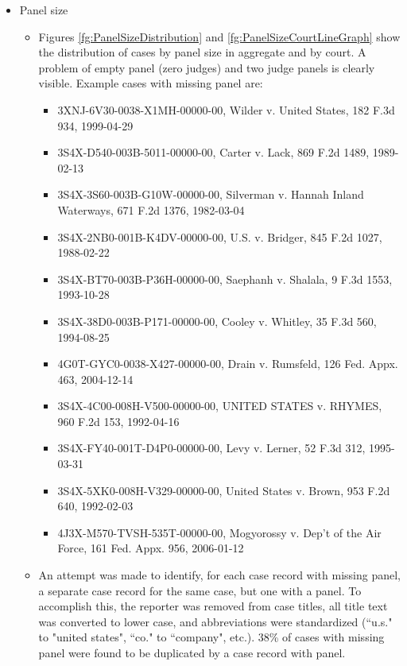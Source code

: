 \documentclass[10pt, letterpaper]{article}
\begin{document}
\begin{spacing}{1.0}
\begin{itemize}
    \item Panel size
    \begin{itemize}
        \item Figures \ref{fg:PanelSizeDistribution} and \ref{fg:PanelSizeCourtLineGraph} show the distribution of cases by panel size in aggregate and by court.  A problem of empty panel (zero judges) and two judge panels is clearly visible.  Example cases with missing panel are:
        \begin{itemize}
            \item 3XNJ-6V30-0038-X1MH-00000-00, Wilder v. United States, 182 F.3d 934, 1999-04-29
            \item 3S4X-D540-003B-5011-00000-00, Carter v. Lack, 869 F.2d 1489, 1989-02-13
            \item 3S4X-3S60-003B-G10W-00000-00, Silverman v. Hannah Inland Waterways, 671 F.2d 1376, 1982-03-04
            \item 3S4X-2NB0-001B-K4DV-00000-00, U.S. v. Bridger, 845 F.2d 1027, 1988-02-22
            \item 3S4X-BT70-003B-P36H-00000-00, Saephanh v. Shalala, 9 F.3d 1553, 1993-10-28
            \item 3S4X-38D0-003B-P171-00000-00, Cooley v. Whitley, 35 F.3d 560, 1994-08-25
            \item 4G0T-GYC0-0038-X427-00000-00, Drain v. Rumsfeld, 126 Fed. Appx. 463, 2004-12-14
            \item 3S4X-4C00-008H-V500-00000-00, UNITED STATES v. RHYMES, 960 F.2d 153, 1992-04-16
            \item 3S4X-FY40-001T-D4P0-00000-00, Levy v. Lerner, 52 F.3d 312, 1995-03-31
            \item 3S4X-5XK0-008H-V329-00000-00, United States v. Brown, 953 F.2d 640, 1992-02-03
            \item 4J3X-M570-TVSH-535T-00000-00, Mogyorossy v. Dep't of the Air Force, 161 Fed. Appx. 956, 2006-01-12
        \end{itemize}

        \item An attempt was made to identify, for each case record with missing panel, a separate case record for the same case, but one with a panel.  To accomplish this, the reporter was removed from case titles, all title text was converted to lower case, and abbreviations were standardized (``u.s." to "united states", ``co." to ``company", etc.).  38\% of cases with missing panel were found to be duplicated by a case record with panel.
        

\end{itemize}
\end{itemize}
\end{spacing}
\end{document}
